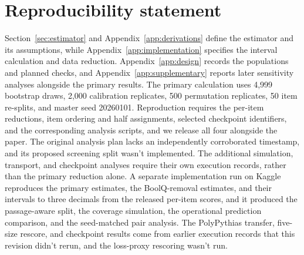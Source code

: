 \documentclass{article}
\begin{document}
\section*{Reproducibility statement}
Section~\ref{sec:estimator} and Appendix~\ref{app:derivations} define the estimator and its assumptions, while Appendix~\ref{app:implementation} specifies the interval calculation and data reduction. Appendix~\ref{app:design} records the populations and planned checks, and Appendix~\ref{app:supplementary} reports later sensitivity analyses alongside the primary results. The primary calculation uses 4,999 bootstrap draws, 2,000 calibration replicates, 500 permutation replicates, 50 item re-splits, and master seed 20260101. Reproduction requires the per-item reductions, item ordering and half assignments, selected checkpoint identifiers, and the corresponding analysis scripts, and we release all four alongside the paper. The original analysis plan lacks an independently corroborated timestamp, and its proposed screening split wasn't implemented. The additional simulation, transport, and checkpoint analyses require their own execution records, rather than the primary reduction alone. A separate implementation run on Kaggle reproduces the primary estimates, the BoolQ-removal estimates, and their intervals to three decimals from the released per-item scores, and it produced the passage-aware split, the coverage simulation, the operational prediction comparison, and the seed-matched pair analysis. The PolyPythias transfer, five-size rescore, and checkpoint results come from earlier execution records that this revision didn't rerun, and the loss-proxy rescoring wasn't run.


\clearpage
\appendix


\end{document}
